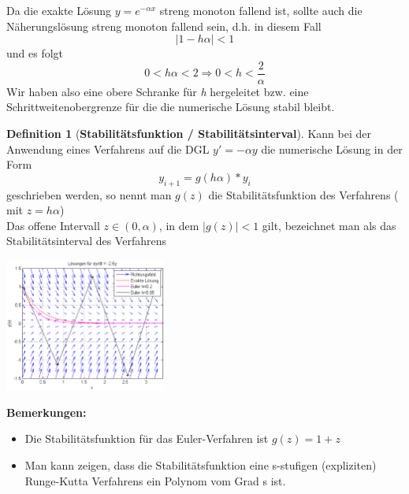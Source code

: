 \documentclass{article}
\newenvironment{Figure}
	{\par\medskip\noindent\minipage{\linewidth}}
	{\endminipage\par\medskip}
\theoremstyle{satz}
\theoremstyle{definition}
\newtheorem{definition}{Definition}
\begin{document}
Da die exakte Lösung $y = e^{-\alpha x}$ streng monoton fallend ist, sollte auch die Näherungslösung streng monoton fallend sein, d.h. in diesem Fall
\begin{equation}
|1 - h \alpha | < 1
\end{equation}
und es folgt
\begin{equation}
0 < h \alpha < 2 \Rightarrow 0 < h < \frac{2}{\alpha}
\end{equation}
Wir haben also eine obere Schranke für \textit{h} hergeleitet bzw. eine Schrittweitenobergrenze für die die numerische Lösung stabil bleibt. 

\begin{tcolorbox}
\begin{definition}[\textbf{Stabilitätsfunktion / Stabilitätsinterval}]
Kann bei der Anwendung eines Verfahrens auf die DGL $y' = -\alpha y$ die numerische Lösung in der Form
\begin{equation}
y_{i+1} = g(h \alpha) * y_i
\end{equation}
geschrieben werden, so nennt man $g(z)$ die Stabilitätsfunktion des Verfahrens ( mit $z = h \alpha$)\\
Das offene Intervall $z \in (0, \alpha)$, in dem $|g(z)|<1$ gilt, bezeichnet man als das Stabilitätsinterval des Verfahrens
\begin{Figure}
\centering
\includegraphics[width=200px]{img/RichtungsfeldEulerVerfahren.png}
	\label{fig:Euler-Verfahren Stabilität}
\end{Figure}

\textbf{Bemerkungen:}\\
\begin{itemize}
\item Die Stabilitätsfunktion für das Euler-Verfahren ist $g(z) = 1 + z$
\item Man kann zeigen, dass die Stabilitätsfunktion eine s-stufigen (expliziten) Runge-Kutta Verfahrens ein Polynom vom Grad s ist.
\end{itemize}
\end{definition}
\end{tcolorbox}
\end{document}

